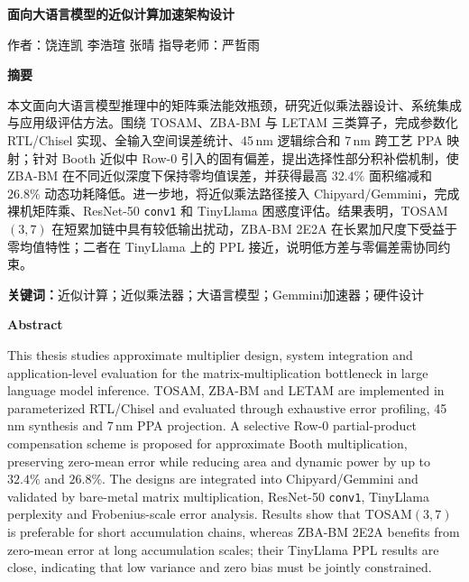 \documentclass[12pt,a4paper,UTF8]{article}
\begin{document}

\maketoc    %
\thispagestyle{empty}

\begin{center}
{\LARGE\bfseries 面向大语言模型的近似计算加速架构设计}

\vspace{1.0em}

{\large
作者：饶连凯  \space 李浩瑄 \space 张晴
\quad 指导老师：严哲雨}
\end{center}


\vspace{1.0em}

\begin{center}
{\Large\bfseries 摘要}
\end{center}

本文面向大语言模型推理中的矩阵乘法能效瓶颈，研究近似乘法器设计、系统集成与应用级评估方法。围绕 TOSAM、ZBA-BM 与 LETAM 三类算子，完成参数化 RTL/Chisel 实现、全输入空间误差统计、45\,nm 逻辑综合和 7\,nm 跨工艺 PPA 映射；针对 Booth 近似中 Row-0 引入的固有偏差，提出选择性部分积补偿机制，使 ZBA-BM 在不同近似深度下保持零均值误差，并获得最高 $32.4\%$ 面积缩减和 $26.8\%$ 动态功耗降低。进一步地，将近似乘法路径接入 Chipyard/Gemmini，完成裸机矩阵乘、ResNet-50 \texttt{conv1} 和 TinyLlama 困惑度评估。结果表明，TOSAM$(3,7)$ 在短累加链中具有较低输出扰动，ZBA-BM 2E2A 在长累加尺度下受益于零均值特性；二者在 TinyLlama 上的 PPL 接近，说明低方差与零偏差需协同约束。

\noindent\textbf{关键词：}近似计算；近似乘法器；大语言模型；Gemmini加速器；硬件设计

\vspace{1.2em}
\begin{center}
{\Large\bfseries Abstract}
\end{center}

This thesis studies approximate multiplier design, system integration and application-level evaluation for the matrix-multiplication bottleneck in large language model inference. TOSAM, ZBA-BM and LETAM are implemented in parameterized RTL/Chisel and evaluated through exhaustive error profiling, 45\,nm synthesis and 7\,nm PPA projection. A selective Row-0 partial-product compensation scheme is proposed for approximate Booth multiplication, preserving zero-mean error while reducing area and dynamic power by up to $32.4\%$ and $26.8\%$. The designs are integrated into Chipyard/Gemmini and validated by bare-metal matrix multiplication, ResNet-50 \texttt{conv1}, TinyLlama perplexity and Frobenius-scale error analysis. Results show that TOSAM$(3,7)$ is preferable for short accumulation chains, whereas ZBA-BM 2E2A benefits from zero-mean error at long accumulation scales; their TinyLlama PPL results are close, indicating that low variance and zero bias must be jointly constrained.
\end{document}
